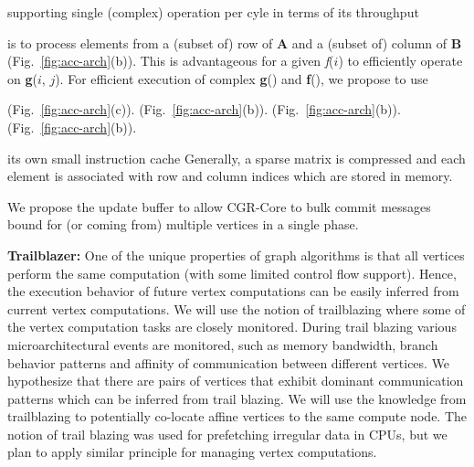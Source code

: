supporting single (complex) operation per cyle in terms of its throughput  

is to process elements from a (subset of) row of \textbf{A} and a (subset of) column of \textbf{B} (Fig.~\ref{fig:acc-arch}(b)).
This is advantageous for a given \textit{f}($i$) to efficiently operate on \textbf{g}($i$, $j$).
For efficient execution of complex \textbf{g}() and \textbf{f}(), we propose to use 

(Fig.~\ref{fig:acc-arch}(c)).
(Fig.~\ref{fig:acc-arch}(b)).
(Fig.~\ref{fig:acc-arch}(b)).
(Fig.~\ref{fig:acc-arch}(b)).


its own small instruction cache
Generally, a sparse matrix is compressed and each element is associated with row and column indices which are stored in memory.


\begin{comment}
\noindent
\textbf{Coarse-Grained Reconfigurable Processing Engine:} 
To efficiently execute graph primitives, we aim to architect the CGR-Core with a coarse-grain reconfigurable (CGR) array of execution units. 
This architecture based on a spatial data-flow architecture can significantly reduce the overhead of instruction fetches and data transfers within an accelerator, as many operations for a complex graph primitive function can be executed by a single (macro) instruction and a few registerfile and/or cache accesses. 
Furthermore, for streaming graph analytics, it is very inefficient to apply computations and changes to individual vertices as they arrive. 
\end{comment}

We propose the update buffer to allow CGR-Core to bulk commit messages bound for (or coming from) multiple vertices in a single phase.

\noindent
\textbf{Trailblazer:} 
One of the unique properties of graph algorithms is that all vertices perform the same computation (with some limited control flow support). 
Hence, the execution behavior of future vertex computations can be easily inferred from current vertex computations. 
We will use the notion of trailblazing where some of the vertex computation tasks are closely monitored. 
During trail blazing various microarchitectural events are monitored, such as memory bandwidth, branch behavior patterns and affinity of communication between different vertices. 
We hypothesize that there are pairs of vertices that exhibit dominant communication patterns which can be inferred from trail blazing. 
We will use the knowledge from trailblazing to potentially co-locate affine vertices to the same compute node. 
The notion of trail blazing was used for prefetching irregular data in CPUs, but we plan to apply similar principle for managing vertex computations.
